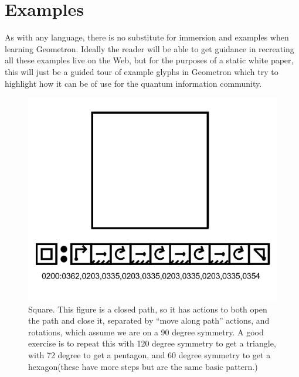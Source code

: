 \documentclass[11pt]{article}
\begin{document}
\section{Examples}


    As with any language, there is no substitute for immersion and examples when learning Geometron.  Ideally the reader will be able to get guidance in recreating all these examples live on the Web, but for the purposes of a static white paper, this will just be a guided tour of example glyphs in Geometron which try to highlight how it can be of use for the quantum information community.



\begin{figure}

\includegraphics[width=\linewidth]{figures/figure15_square.png}

\caption{Square.  This figure is a closed path, so it has actions to both open the path and close it, separated by ``move along path'' actions, and rotations, which assume we are on a 90 degree symmetry.  A good exercise is to repeat this with 120 degree symmetry to get a triangle, with 72 degree to get a pentagon, and 60 degree symmetry to get a hexagon(these have more steps but are the same basic pattern.)}
\end{figure}
\end{document}
